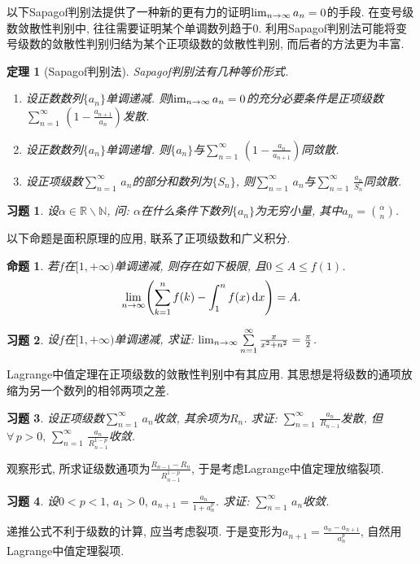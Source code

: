 \documentclass[11pt,a4paper]{ctexart}
\makeatletter
\theoremstyle{thmseries} %
\newtheorem{thm}{定理}[section]
\newtheorem{prop}{命题}[section]
\theoremstyle{exerseries}
\newtheorem{exer}{习题}[section]
\renewenvironment{proof}[1][\proofname]{\par
  \pushQED{\qed}%
  \normalfont \topsep6\p@\@plus6\p@\relax
  \trivlist
  \item[\hskip\labelsep
        \itshape
    #1\@addpunct{}]\ignorespaces
}{%
  \popQED\endtrivlist\@endpefalse
}
\newenvironment{pf}{\begin{proof}[\bfseries\upshape 证\quad]}{\end{proof}}
\newcommand{\bra}[1]{\mathopen{}\left(#1\right)}
\newcommand{\R}{\mathbb{R}}
\newcommand{\N}{\mathbb{N}}
\renewcommand{\d}{\mathrm{d}}
\def \nti {\mathnormal{n}\to\infty}
\def \tseries {{\textstyle\sum\limits_{n=1}^{\infty}}\,} %
\makeatother
\begin{document}
以下Sapagof判别法提供了一种新的更有力的证明$\lim_{\nti}a_n=0$的手段. 在变号级数敛散性判别中, 往往需要证明某个单调数列趋于$0$. 利用Sapagof判别法可能将变号级数的敛散性判别归结为某个正项级数的敛散性判别, 而后者的方法更为丰富. 
\begin{thm}[Sapagof判别法]
	Sapagof判别法有几种等价形式. 
	\begin{enumerate}
		\item 设正数数列$\{a_n\}$单调递减. 则$\lim_{\nti}a_n=0$的充分必要条件是正项级数$\tseries\bra{1-\frac{a_{n+1}}{a_n}}$发散. 
		\item 设正数数列$\{a_n\}$单调递增. 则$\{a_n\}$与$\tseries\bra{1-\frac{a_n}{a_{n+1}}}$同敛散. 
		\item 设正项级数$\tseries a_n$的部分和数列为$\{S_n\}$, 则$\tseries a_n$与$\tseries\frac{a_n}{S_n}$同敛散. 
	\end{enumerate}
\end{thm}

\begin{exer}
	设$\alpha\in\R\backslash\N$, 问: $\alpha$在什么条件下数列$\{a_n\}$为无穷小量, 其中$a_n=\binom{\alpha}{n}$. 
\end{exer}

以下命题是面积原理的应用, 联系了正项级数和广义积分. 
\begin{prop}
	若$f$在$[1,+\infty)$单调递减, 则存在如下极限, 且$0\leq A\leq f(1)$. 
	\[\lim_{\nti}\bra{\sum_{k=1}^{n}f(k)-\int_{1}^{n}f(x)\,\d x}=A.\]
\end{prop}

\begin{exer}
	设$f$在$[1,+\infty)$单调递减, 求证: $\lim_{\nti}\tseries\frac{x}{x^2+n^2}=\frac{\pi}{2}$. 
\end{exer}

Lagrange中值定理在正项级数的敛散性判别中有其应用. 其思想是将级数的通项放缩为另一个数列的相邻两项之差. 
\begin{exer}
	设正项级数$\tseries a_n$收敛, 其余项为$R_n$. 求证: $\tseries\frac{a_n}{R_{n-1}}$发散, 但$\forall\,p>0,\,\tseries\frac{a_n}{R_{n-1}^{1-p}}$收敛. 
\end{exer}
\begin{pf}
	观察形式, 所求证级数通项为$\frac{R_{n-1}-R_n}{R_{n-1}^{1-p}}$, 于是考虑Lagrange中值定理放缩裂项. 
\end{pf}

\begin{exer}
	设$0<p<1,\,a_1>0,\,a_{n+1}=\frac{a_n}{1+a_n^p}$. 求证: $\tseries a_n$收敛. 
\end{exer}
\begin{pf}
	递推公式不利于级数的计算, 应当考虑裂项. 于是变形为$a_{n+1}=\frac{a_n-a_{n+1}}{a_n^p}$, 自然用Lagrange中值定理裂项. 
\end{pf}
\end{document}
